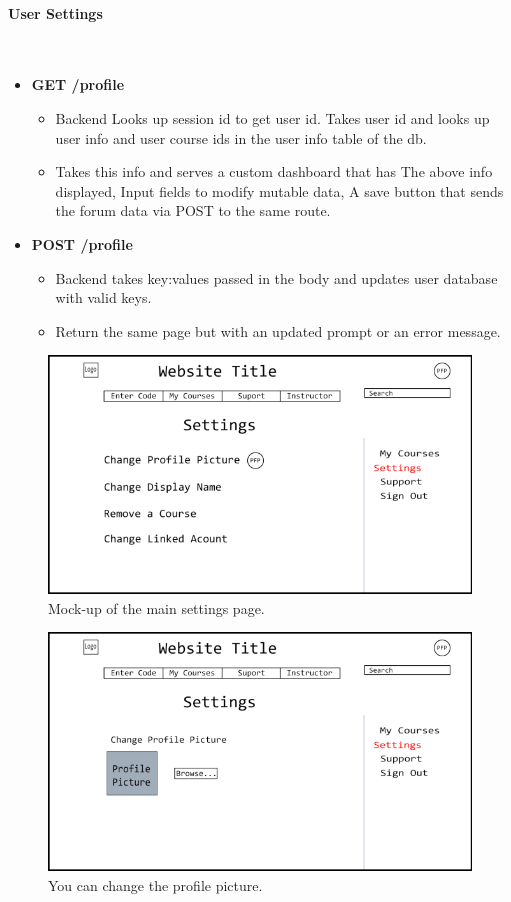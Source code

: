 \documentclass{article}
\begin{document}
\newpage

\paragraph{User Settings}\\
\begin{itemize}
    \item \textbf{GET /profile}
        \begin{itemize}
        \item Backend Looks up session id to get user id. Takes user id and
            looks up user info and user course ids in the user info table of
                the db.
        \item Takes this info and serves a custom dashboard that has The above info displayed, Input fields to modify mutable data, A save button that sends the forum data via POST to the same route.
    \end{itemize}
\item \textbf{POST /profile}
    \begin{itemize}
        \item Backend takes key:values passed in the body and updates user database with valid keys.
        \item Return the same page but with an updated prompt or an error message.
    \end{itemize}
\end{itemize}
\begin{figure}[h!]
    \caption{Mock-up of the main settings page.}
    \includegraphics[width=\textwidth]{user_settings_page}
\end{figure}
\begin{figure}[h!]
    \caption{You can change the profile picture.}
    \includegraphics[width=\textwidth]{user_settings_page_pfp}
\end{figure}
\end{document}
